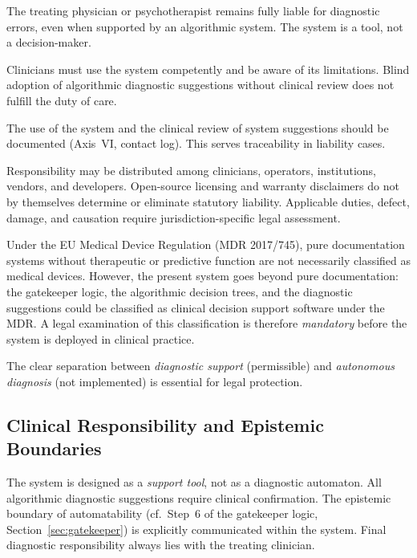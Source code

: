 \documentclass[11pt,a4paper]{article}
\begin{document}
\begin{description}[style=nextline, leftmargin=1.5cm, font=\bfseries]
\item[Clinician liability remains] The treating physician or psychotherapist remains fully liable for diagnostic errors, even when supported by an algorithmic system. The system is a tool, not a decision-maker.
\item[Duty of care in system use] Clinicians must use the system competently and be aware of its limitations. Blind adoption of algorithmic diagnostic suggestions without clinical review does not fulfill the duty of care.
\item[Documentation obligation] The use of the system and the clinical review of system suggestions should be documented (Axis~VI, contact log). This serves traceability in liability cases.
\item[Responsibility and product liability] Responsibility may be distributed among clinicians, operators, institutions, vendors, and developers. Open-source licensing and warranty disclaimers do not by themselves determine or eliminate statutory liability. Applicable duties, defect, damage, and causation require jurisdiction-specific legal assessment.
\item[Medical device classification requires legal clarification] Under the EU Medical Device Regulation (MDR 2017/745), pure documentation systems without therapeutic or predictive function are not necessarily classified as medical devices. However, the present system goes beyond pure documentation: the gatekeeper logic, the algorithmic decision trees, and the diagnostic suggestions could be classified as clinical decision support software under the MDR. A legal examination of this classification is therefore \textit{mandatory} before the system is deployed in clinical practice.
\end{description}

The clear separation between \textit{diagnostic support} (permissible) and \textit{autonomous diagnosis} (not implemented) is essential for legal protection.

\subsection{Clinical Responsibility and Epistemic Boundaries}

The system is designed as a \textit{support tool}, not as a diagnostic automaton. All algorithmic diagnostic suggestions require clinical confirmation. The epistemic boundary of automatability (cf.\ Step~6 of the gatekeeper logic, Section~\ref{sec:gatekeeper}) is explicitly communicated within the system. Final diagnostic responsibility always lies with the treating clinician.
\end{document}
